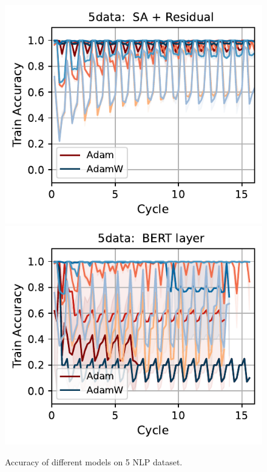 \begin{figure}[t]
{        \includegraphics[width=\textwidth]{figs/Accuracy/5nlp/attention_residual/5data_40.pdf}
        \includegraphics[width=\textwidth]{figs/Accuracy/5nlp/bert_layer/5data_40.pdf}
    }
    \caption{Accuracy of different models on 5 NLP dataset.}
    \label{fig:5nlp_models}
\end{figure}




